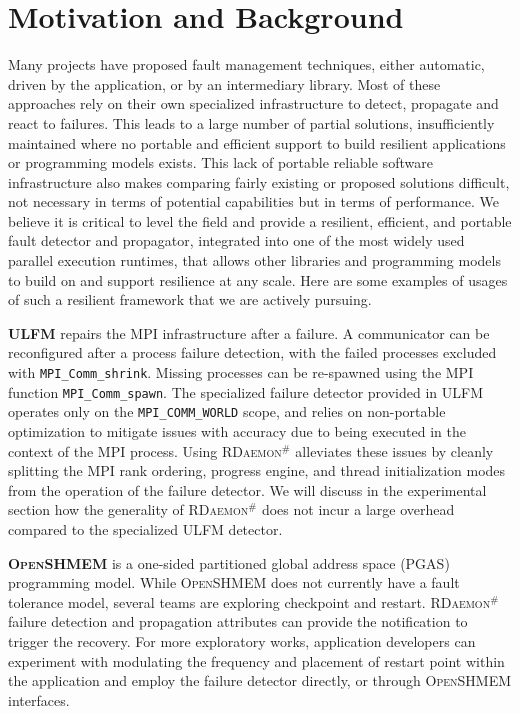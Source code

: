 \documentclass[sigconf]{acmart}
\newcommand{\mpifunc}[1]{\lstinline"MPI_#1"\xspace}
\newcommand{\ulfm}[0]{\textsc{ULFM}\xspace}
\newcommand{\mpi}[0]{\textsc{MPI}\xspace}
\newcommand{\oshmem}[0]{\textsc{OpenSHMEM}\xspace}
\newcommand{\ourwork}[0]{\textsc{RDaemon}\ensuremath{^\#}\xspace}
\begin{document}
\section{Motivation and Background}\label{sec:motivation}

Many projects have proposed fault management techniques, either automatic,
 driven by the application, or by an intermediary library. Most of these approaches 
rely on their own specialized infrastructure to detect, propagate and react to failures. 
This leads to a large number of partial solutions, insufficiently maintained where no portable
and efficient support to build resilient applications or programming models exists.
This lack of portable reliable software infrastructure also makes comparing fairly 
existing or proposed solutions difficult, not necessary in terms of potential capabilities
but in terms of performance. We believe it is critical to level the field and provide a resilient, efficient, and portable fault detector and propagator, integrated into one of the most widely used parallel execution runtimes, that allows other libraries and programming models to build on and support resilience at any scale. Here are some examples of usages of such a resilient framework that we are actively pursuing.

\textbf{\ulfm} repairs the \mpi infrastructure after a failure. A communicator can be reconfigured after a 
process failure detection, with the failed processes excluded with \mpifunc{Comm_shrink}. Missing processes 
can be re-spawned using the \mpi function \mpifunc{Comm_spawn}. The specialized failure detector provided 
in \ulfm operates only on the \mpifunc{COMM_WORLD} scope, and relies on non-portable optimization 
to mitigate issues with accuracy due to being executed in the context of the \mpi process. 
Using \ourwork alleviates these issues by cleanly splitting the \mpi rank ordering, 
progress engine, and thread initialization modes from the operation of the failure 
detector. We will discuss in the experimental section how the generality of 
\ourwork does not incur a large overhead compared to the specialized \ulfm detector.

\textbf{\oshmem} is a one-sided partitioned global address space (PGAS) programming model. While \oshmem does 
not  currently have a fault tolerance model, several teams are exploring checkpoint and restart.
\ourwork failure detection and propagation attributes can provide the 
notification to trigger the recovery. For more exploratory works, 
application developers can experiment with modulating the frequency and
 placement of restart point within the application and employ the 
 failure detector directly, or through \oshmem interfaces.
 
\end{document}
